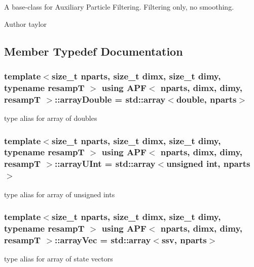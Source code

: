 A base-\/class for Auxiliary Particle Filtering. Filtering only, no smoothing. 

\begin{DoxyAuthor}{Author}
taylor 
\end{DoxyAuthor}


\subsection{Member Typedef Documentation}
\subsubsection[{\texorpdfstring{array\+Double}{arrayDouble}}]{\setlength{\rightskip}{0pt plus 5cm}template$<$size\+\_\+t nparts, size\+\_\+t dimx, size\+\_\+t dimy, typename resampT $>$ using {\bf A\+PF}$<$ nparts, dimx, dimy, resampT $>$\+::{\bf array\+Double} =  std\+::array$<$double, nparts$>$}\hypertarget{classAPF_a004eb76b0bd0c79820674bdeb5a6c2c1}{}\label{classAPF_a004eb76b0bd0c79820674bdeb5a6c2c1}
type alias for array of doubles 
\subsubsection[{\texorpdfstring{array\+U\+Int}{arrayUInt}}]{\setlength{\rightskip}{0pt plus 5cm}template$<$size\+\_\+t nparts, size\+\_\+t dimx, size\+\_\+t dimy, typename resampT $>$ using {\bf A\+PF}$<$ nparts, dimx, dimy, resampT $>$\+::{\bf array\+U\+Int} =  std\+::array$<$unsigned int, nparts$>$}\hypertarget{classAPF_a43238fa97dbb1862121ea2aa6f2a9dd1}{}\label{classAPF_a43238fa97dbb1862121ea2aa6f2a9dd1}
type alias for array of unsigned ints 
\subsubsection[{\texorpdfstring{array\+Vec}{arrayVec}}]{\setlength{\rightskip}{0pt plus 5cm}template$<$size\+\_\+t nparts, size\+\_\+t dimx, size\+\_\+t dimy, typename resampT $>$ using {\bf A\+PF}$<$ nparts, dimx, dimy, resampT $>$\+::{\bf array\+Vec} =  std\+::array$<${\bf ssv}, nparts$>$}\hypertarget{classAPF_a58fdbb8fc5629feb9bb5fe9a9de19554}{}\label{classAPF_a58fdbb8fc5629feb9bb5fe9a9de19554}
type alias for array of state vectors 
